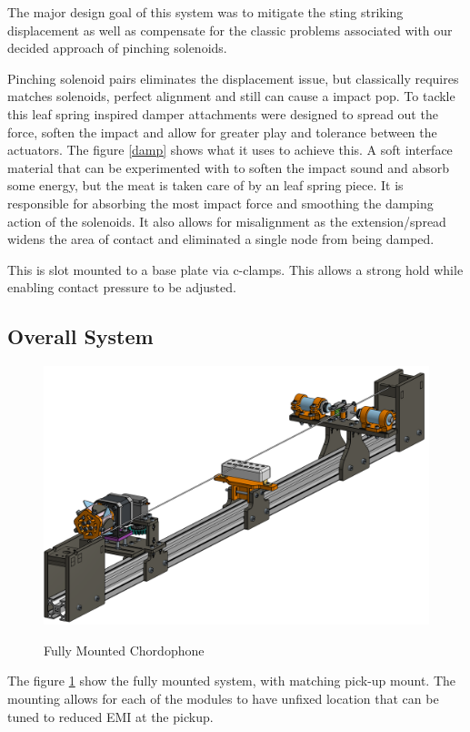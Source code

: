 \documentclass[a4paper,11pt]{article}
\begin{document}
The major design goal of this system was to mitigate the sting striking displacement as well as compensate for the classic problems associated with our decided approach of pinching solenoids.

Pinching solenoid pairs eliminates the displacement issue, but classically requires matches solenoids, perfect alignment and still can cause a impact pop.
To tackle this leaf spring inspired damper attachments were designed to spread out the force, soften the impact and allow for greater play and tolerance between the actuators. The figure \ref{damp} shows what it uses to achieve this. A soft interface material that can be experimented with to soften the impact sound and absorb some energy, but the meat is taken care of by an leaf spring piece. It is responsible for absorbing the most impact force and smoothing the damping action of the solenoids. It also allows for misalignment as the extension/spread widens the area of contact and eliminated a single node from being damped.

This is slot mounted to a base plate via c-clamps. This allows a strong hold while enabling contact pressure to be adjusted.

\newpage
\subsection{Overall System}

\begin{figure}[h!]
  \begin{center}
    \includegraphics[width=.8\textwidth]{images/picker_damper_full.png}
    \label{Overall}
    \caption{Fully Mounted Chordophone}
  \end{center}
\end{figure}

The figure \ref{Overall} show the fully mounted system, with matching pick-up mount. The mounting allows for each of the modules to have unfixed location that can be tuned to reduced EMI at the pickup.
\end{document}
